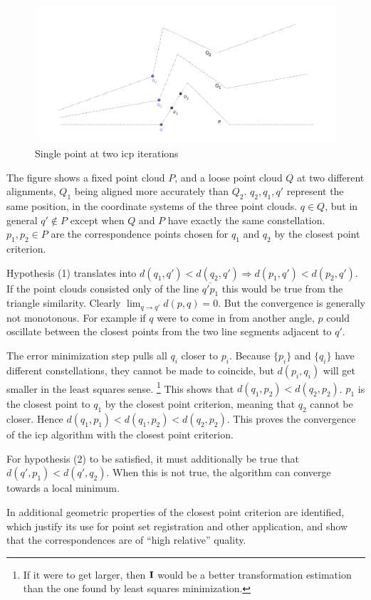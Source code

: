 \begin{figure}
\includegraphics[width=.5\textwidth]{fig/icp_true_approx_cor.pdf}
\caption{Single point at two \gls{icp} iterations}
\label{fig:icp_true_approx_cor}
\end{figure}
The figure shows a fixed point cloud $P$, and a loose point cloud $Q$ at two different alignments, $Q_1$ being aligned more accurately than $Q_2$. $q_2, q_1, q'$ represent the same position, in the coordinate systems of the three point clouds. $q \in Q$, but in general $q' \notin P$ except when $Q$ and $P$ have exactly the same constellation.
$p_1, p_2 \in P$ are the correspondence points chosen for $q_1$ and $q_2$ by the closest point criterion.

Hypothesis (1) translates into $d(q_1, q') < d(q_2, q') \Rightarrow d(p_1, q') < d(p_2, q')$. If the point clouds consisted only of the line $\bar{q' p_1}$ this would be true from the triangle similarity. Clearly $\lim_{q \rightarrow q'} d(p, q) = 0$. But the convergence is generally not monotonous. For example if $q$ were to come in from another angle, $p$ could oscillate between the closest points from the two line segments adjacent to $q'$.

The error minimization step pulls all $q_i$ closer to $p_i$. Because $\{ p_i \}$ and $\{ q_i \}$ have different constellations, they cannot be made to coincide, but $d(p_i, q_i)$ will get smaller in the least squares sense. \footnote{If it were to get larger, then $\mathbf{I}$ would be a better transformation estimation than the one found by least squares minimization.} This shows that $d(q_1, p_2) < d(q_2, p_2)$. $p_1$ is the closest point to $q_1$ by the closest point criterion, meaning that $q_2$ cannot be closer. Hence $d(q_1, p_1) < d(q_1, p_2) < d(q_2, p_2)$. This proves the convergence of the \gls{icp} algorithm with the closest point criterion.

For hypothesis (2) to be satisfied, it must additionally be true that $d(q', p_1) < d(q', q_2)$. When this is not true, the algorithm can converge towards a local minimum.

In \cite{Liu2008} additional geometric properties of the closest point criterion are identified, which justify its use for point set registration and other application, and show that the correspondences are of ``high relative'' quality.




